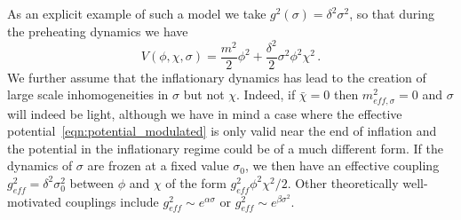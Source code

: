 \documentclass[11pt,a4paper]{article}
\begin{document}
As an explicit example of such a model we take $g^2(\sigma) = \delta^2\sigma^2$, so that during the preheating dynamics we have
\begin{equation}
  V(\phi,\chi,\sigma) = \frac{m^2}{2}\phi^2 + \frac{\delta^2}{2}\sigma^2\phi^2\chi^2 \, .
  \label{eqn:potential_modulated}
\end{equation}
We further assume that the inflationary dynamics has lead to the creation of large scale inhomogeneities in $\sigma$ but not $\chi$.
Indeed, if $\bar{\chi}=0$ then $m_{eff,\sigma}^2 = 0$ and $\sigma$ will indeed be light, although we have in mind a case where the effective potential~\eqref{eqn:potential_modulated} is only valid near the end of inflation and the potential in the inflationary regime could be of a much different form.
If the dynamics of $\sigma$ are frozen at a fixed value $\sigma_0$, we then have an effective coupling $g_{eff}^2 = \delta^2\sigma_0^2$ between $\phi$ and $\chi$ of the form $g_{eff}^2\phi^2\chi^2/2$.
Other theoretically well-motivated couplings include $g_{eff}^2 \sim e^{\alpha \sigma}$ or $g_{eff}^2 \sim e^{\beta\sigma^2}$.
\end{document}
